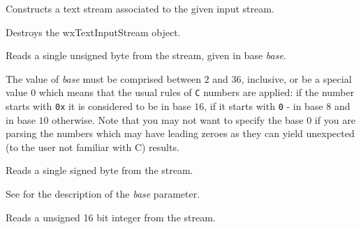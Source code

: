 
Constructs a text stream associated to the given input stream.






\label{wxtextinputstreamdtor}


Destroys the wxTextInputStream object.


\label{wxtextinputstreamread8}


Reads a single unsigned byte from the stream, given in base {\it base}.

The value of {\it base} must be comprised between $2$ and $36$, inclusive, or
be a special value $0$ which means that the usual rules of {\tt C} numbers are
applied: if the number starts with {\tt 0x} it is considered to be in base
$16$, if it starts with {\tt 0} - in base $8$ and in base $10$ otherwise. Note
that you may not want to specify the base $0$ if you are parsing the numbers
which may have leading zeroes as they can yield unexpected (to the user not
familiar with C) results.


\label{wxtextinputstreamread8s}


Reads a single signed byte from the stream.

See  for the
description of the {\it base} parameter.


\label{wxtextinputstreamread16}


Reads a unsigned 16 bit integer from the stream.

